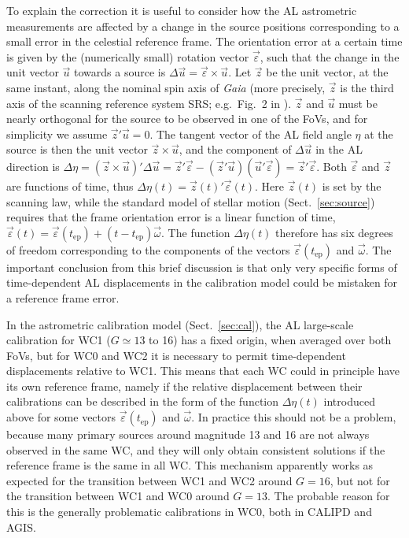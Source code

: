 \documentclass[longauth]{aa} %
\begin{document}
To explain the correction it is useful to consider how the AL astrometric measurements 
are affected by a change in the source positions corresponding to a small error in the 
celestial reference frame. The orientation error at a certain time is given by the 
(numerically small) rotation vector $\vec{\varepsilon}$, such that the change in the 
unit vector $\vec{u}$ towards a source is $\Delta\vec{u}=\vec{\varepsilon}\times\vec{u}$. 
Let $\vec{z}$ be the unit vector, at the same instant, along the nominal spin axis of 
\textit{Gaia}  (more precisely, $\vec{z}$ is the third axis of the scanning reference 
system SRS; e.g.\ Fig.~2 in ).
$\vec{z}$ and $\vec{u}$ must be nearly orthogonal for the source to be observed 
in one of the FoVs, and for simplicity we assume $\vec{z}'\vec{u}=0$. The 
tangent vector of the AL field angle $\eta$ at the source is then the unit vector 
$\vec{z}\times\vec{u}$, and the component of $\Delta\vec{u}$ in the AL direction is 
$\Delta\eta=(\vec{z}\times\vec{u})'\Delta\vec{u} = 
\vec{z}'\vec{\varepsilon}-(\vec{z}'\vec{u})(\vec{u}'\vec{\varepsilon})=\vec{z}'\vec{\varepsilon}$.
Both $\vec{\varepsilon}$ and $\vec{z}$ are functions of time, thus
$\Delta\eta(t) = \vec{z}(t)'\vec{\varepsilon}(t)$. Here $\vec{z}(t)$ is set by the 
scanning law, while the standard model of stellar motion (Sect.~\ref{sec:source}) 
requires that the frame orientation error is a linear function of time, 
$\vec{\varepsilon}(t)=\vec{\varepsilon}(t_\text{ep})+(t-t_\text{ep})\vec{\omega}$.
The function $\Delta\eta(t)$ therefore has six degrees of freedom corresponding to the 
components of the vectors $\vec{\varepsilon}(t_\text{ep})$ and $\vec{\omega}$. The
important conclusion from this brief discussion is that only very specific forms of
time-dependent AL displacements in the calibration model could be mistaken for  
a reference frame error. 

In the astrometric calibration
model (Sect.~\ref{sec:cal}), the AL large-scale calibration for WC1 ($G\simeq 13$ to 16) has 
a fixed origin, when averaged over both FoVs, but for WC0 and WC2 it is necessary
to permit time-dependent displacements relative to WC1. This means that each WC could 
in principle have its own reference frame, namely if the relative displacement between their
calibrations can be described in the form of the function $\Delta\eta(t)$ introduced above
for some vectors $\vec{\varepsilon}(t_\text{ep})$ and $\vec{\omega}$. 
In practice this should not be a problem, because many primary 
sources around magnitude 13 and 16 are not always observed in the same WC, and they
will only obtain consistent solutions if the reference frame is the same in all WC. This
mechanism apparently works as expected for the transition between WC1 and WC2 around 
$G=16$, but not for the transition between WC1 and WC0 around $G=13$. The probable
reason for this is the generally problematic calibrations in WC0, both in CALIPD and AGIS.
\end{document}
